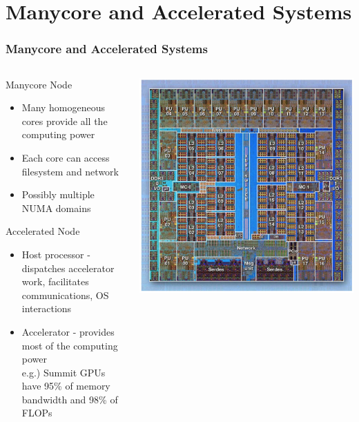 \documentclass[aspectratio=169]{beamer}
\begin{document}
\section{Manycore and Accelerated Systems}
\begin{frame}
  \frametitle{Manycore and Accelerated Systems}
  \begin{columns}
    \begin{column}{0.7\textwidth}
      Manycore Node
      \begin{itemize}
        \item Many homogeneous cores provide all the computing power
        \item Each core can access filesystem and network
        \item Possibly multiple NUMA domains
      \end{itemize}
      Accelerated Node
      \begin{itemize}
        \item Host processor - dispatches accelerator work, facilitates
          communications, OS interactions
        \item Accelerator - provides most of the computing power \\
          e.g.) Summit GPUs have 95\% of memory bandwidth and 98\% of FLOPs
      \end{itemize}
    \end{column}
    \begin{column}{0.3\textwidth}
      \centering
      \includegraphics[width=\textwidth]{figures/A2processor.jpg}\\

\end{column}
\end{columns}
\end{frame}
\end{document}
